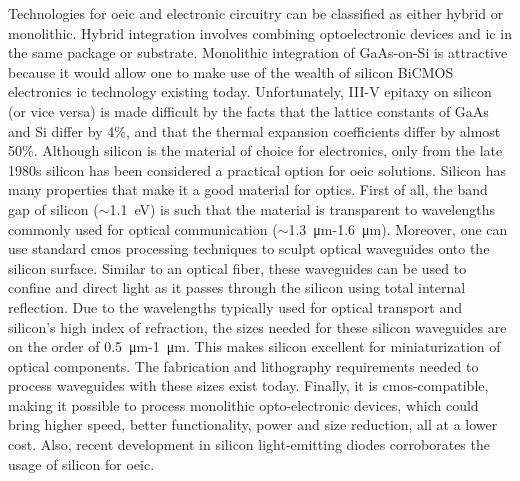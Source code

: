 \documentclass[../report.tex]{subfiles}
\begin{document}
Technologies for \gls{oeic} and electronic circuitry can be classified as either hybrid or monolithic. Hybrid integration involves combining optoelectronic devices and \gls{ic} in the same package or substrate. Monolithic integration of GaAs-on-Si is attractive because it would allow one to make use of the wealth of silicon BiCMOS electronics \gls{ic} technology existing today. Unfortunately, III-V epitaxy on silicon (or vice versa) is made difficult by the facts that the lattice constants of GaAs and Si differ by 4\%, and that the thermal expansion coefficients differ by almost 50\%. Although silicon is the material of choice for electronics, only from the late 1980s silicon has been considered a practical option for \gls{oeic} solutions. Silicon has many properties that make it a good material for optics. First of all, the band gap of silicon ($\sim$\SI{1.1}{\electronvolt}) is such that the material is transparent to wavelengths commonly used for optical communication ($\sim$\SI{1.3}{\micro\metre}-\SI{1.6}{\micro\metre}). Moreover, one can use standard \gls{cmos} processing techniques to sculpt optical waveguides onto the silicon surface. Similar to an optical fiber, these waveguides can be used to confine and direct light as it passes through the silicon \cite{reed_silicon_2004} using total internal reflection. Due to the wavelengths typically used for optical transport and silicon’s high index of refraction, the sizes needed for these silicon waveguides are on the order of \SI{0.5}{\micro\metre}-\SI{1}{\micro\metre}. This makes silicon excellent for miniaturization of optical components. The fabrication and lithography requirements needed to process waveguides with these sizes exist today. Finally, it is \gls{cmos}-compatible, making it possible to process monolithic opto-electronic devices, which could bring higher speed, better functionality, power and size reduction, all at a lower cost. Also, recent development in silicon light-emitting diodes \cite{green_efficient_2001} corroborates the usage of silicon for \gls{oeic}. \par
\end{document}
